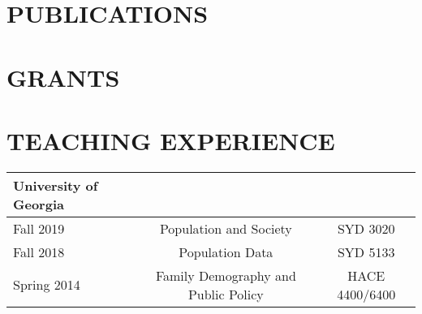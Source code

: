 \documentclass[letterpaper,11pt]{article}
\begin{document}

\section{PUBLICATIONS}



\section{GRANTS}


\section{TEACHING EXPERIENCE}
\begin{tabularx}{\linewidth}{l c c}
\textbf{University of Georgia} & & \\
\hline
Fall 2019 & Population and Society & SYD 3020\\
Fall 2018 & Population Data & SYD 5133\\
Spring 2014 & Family Demography and Public Policy & HACE 4400/6400\\
\hline
\end{tabularx}



\end{document}
